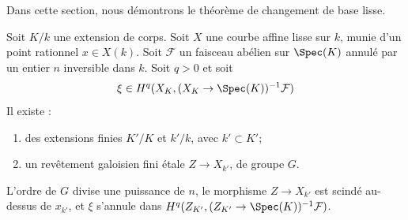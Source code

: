 \noindent
Dans cette section, nous démontrons le théorème de changement de base lisse.

\begin{lemma}
\label{lemma-smooth-base-change-fields}
Soit $K/k$ une extension de corps. Soit $X$ une courbe affine lisse
sur $k$, munie d'un point rationnel $x \in X(k)$. Soit $\mathcal{F}$ un faisceau
abélien sur $\Spec(K)$ annulé par un entier $n$ inversible dans $k$.
Soit $q > 0$ et soit
$$
\xi \in H^q(X_K, (X_K \to \Spec(K))^{-1}\mathcal{F})
$$
Il existe :
\begin{enumerate}
\item des extensions finies $K'/K$ et $k'/k$, avec $k' \subset K'$;
\item un revêtement galoisien fini étale $Z \to X_{k'}$, de groupe $G$.
\end{enumerate}
L'ordre de $G$ divise une puissance de $n$, le morphisme
$Z \to X_{k'}$ est scindé au-dessus de $x_{k'}$, et
$\xi$ s'annule dans $H^q(Z_{K'}, (Z_{K'} \to \Spec(K))^{-1}\mathcal{F})$.
\end{lemma}

